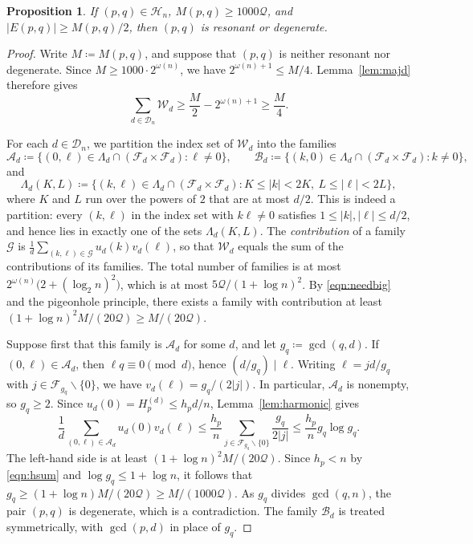 \documentclass[12pt]{amsart}
\newtheorem{proposition}[theorem]{Proposition}
\theoremstyle{definition}
\begin{document}
\begin{proposition}
\label{prop:reduction}
If $(p,q)\in\mathcal{H}_n$, $M(p,q)\ge1000 \mathcal{Q}$, and $|E(p,q)|\ge M(p,q)/2$, then $(p,q)$ is resonant or degenerate.
\end{proposition}

\begin{proof}
Write $M\coloneq M(p,q)$, and suppose that $(p,q)$ is neither resonant nor degenerate.  Since $M\ge1000\cdot2^{\omega(n)}$, we have $2^{\omega(n)+1}\le M/4$.  Lemma~\ref{lem:majd} therefore gives
\begin{equation}
\label{eqn:needbig}
\sum_{d\in\mathcal{D}_n}\mathcal{W}_d \ge \frac M2-2^{\omega(n)+1} \ge \frac M4 .
\end{equation}

For each $d\in\mathcal{D}_n$, we partition the index set of $\mathcal{W}_d$ into the families
\[
\mathcal{A}_d\coloneq \{(0,\ell)\in\Lambda_d\cap(\mathcal{F}_d\times\mathcal{F}_d)\colon \ell\ne0\},\qquad \mathcal{B}_d\coloneq \{(k,0)\in\Lambda_d\cap(\mathcal{F}_d\times\mathcal{F}_d)\colon k\ne0\},
\]
and
\[
\Lambda_d(K,L)\coloneq \{(k,\ell)\in\Lambda_d\cap(\mathcal{F}_d\times \mathcal{F}_d)\colon K\le|k|<2K,\ L\le|\ell|<2L\},
\]
where $K$ and $L$ run over the powers of $2$ that are at most $d/2$.  This is indeed a partition: every $(k,\ell)$ in the index set with $k\ell\ne0$ satisfies $1\le|k|,|\ell|\le d/2$, and hence lies in exactly one of the sets $\Lambda_d(K,L)$.  The \emph{contribution} of a family $\mathcal{G}$ is $\frac1d\sum_{(k,\ell)\in\mathcal{G}}u_d(k)v_d(\ell)$, so that $\mathcal{W}_d$ equals the sum of the contributions of its families.  The total number of families is at most $2^{\omega(n)}\big(2+(\log_2n)^2\big)$, which is at most $5 \mathcal{Q}/(1+\log n)^2$.  By \eqref{eqn:needbig} and the pigeonhole principle, there exists a family with contribution at least $(1+\log n)^2M/(20 \mathcal{Q})\geq M/(20 \mathcal{Q})$.

Suppose first that this family is $\mathcal{A}_d$ for some $d$, and let $g_q\coloneq \gcd(q,d)$.  If $(0,\ell)\in\mathcal{A}_d$, then $\ell q\equiv0\pmod d$, hence $(d/g_q)\mid\ell$.  Writing $\ell=jd/g_q$ with $j\in\mathcal{F}_{g_q}\smallsetminus\{0\}$, we have $v_d(\ell)=g_q/(2|j|)$.  In particular, $\mathcal{A}_d$ is nonempty, so $g_q\ge2$.  Since $u_d(0)=H^{(d)}_p\le h_pd/n$, Lemma~\ref{lem:harmonic} gives
\[
\frac{1}{d}\sum_{(0,\ell)\in\mathcal{A}_d}u_d(0)v_d(\ell) \le \frac{h_p}{n}\sum_{j\in\mathcal{F}_{g_q}\smallsetminus\{0\}}\frac{g_q}{2|j|} \le \frac{h_p}{n} g_q\log g_q .
\]
The left-hand side is at least $(1+\log n)^2M/(20 \mathcal{Q})$.  Since $h_p<n$ by \eqref{eqn:hsum} and $\log g_q\le1+\log n$, it follows that $g_q\ge(1+\log n)M/(20 \mathcal{Q})\ge M/(1000 \mathcal{Q})$.  As $g_q$ divides $\gcd(q,n)$, the pair $(p,q)$ is degenerate, which is a contradiction.  The family $\mathcal{B}_d$ is treated symmetrically, with $\gcd(p,d)$ in place of $g_q$.


\end{proof}
\end{document}
